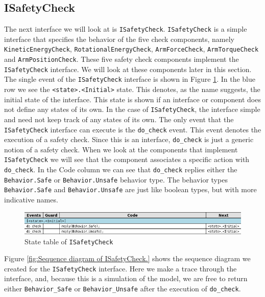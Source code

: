 \documentclass[12pt]{scrreprt}
\begin{document}
\subsection{ISafetyCheck}
The next interface we will look at is \texttt{ISafetyCheck}. \texttt{ISafetyCheck} is a simple interface that specifies the behavior of the five check components, namely \texttt{KineticEnergyCheck}, \texttt{RotationalEnergyCheck}, \texttt{ArmForceCheck}, \texttt{ArmTorqueCheck} and \texttt{ArmPositionCheck}. These five safety check components implement the \texttt{ISafetyCheck} interface. We will look at these components later in this section. The single event of the \texttt{ISafetyCheck} interface is shown in Figure \ref{fig:ISafetyCheck_state_table}. In the blue row we see the \texttt{<state>.<Initial>} state. This denotes, as the name suggests, the initial state of the interface. This state is shown if an interface or component does not define any states of its own. In the case of \texttt{ISafetyCheck}, the interface simple and need not keep track of any states of its own. The only event that the \texttt{ISafetyCheck} interface can execute is the \texttt{do\_check} event. This event denotes the execution of a safety check. Since this is an interface, \texttt{do\_check} is just a generic notion of a safety check. When we look at the components that implement \texttt{ISafetyCheck} we will see that the component associates a specific action with \texttt{do\_check}. In the Code column we can see that \texttt{do\_check} replies either the \texttt{Behavior.Safe} or \texttt{Behavior.Unsafe} behavior type. The behavior types \texttt{Behavior.Safe} and \texttt{Behavior.Unsafe} are just like boolean types, but with more indicative names.

\begin{figure}[H]
    \centering
    \includegraphics[width=\textwidth]{Figures/results/modelling_figures/ISafetyCheck/ISafetyCheck_state_table.png}
    \caption{State table of \texttt{ISafetyCheck}}
    \label{fig:ISafetyCheck_state_table}
\end{figure}

Figure \ref{fig:Sequence diagram of ISafetyCheck.} shows the sequence diagram we created for the \texttt{ISafetyCheck} interface. Here we make a trace through the interface, and, because this is a simulation of the model, we are free to return either \texttt{Behavior\_Safe} or \texttt{Behavior\_Unsafe} after the execution of \texttt{do\_check}.
\end{document}
